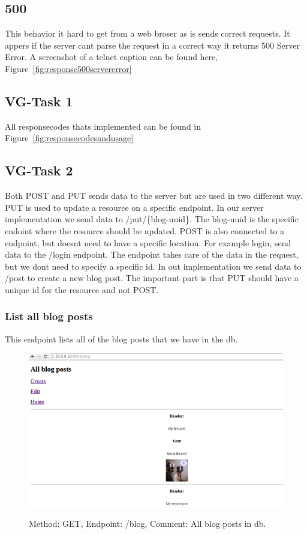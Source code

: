 \documentclass[a4paper,12pt]{article} %
\begin{document}
{\subsection{500}

This behavior it hard to get from a web broser as is sends correct requests.
It appers if the server cant parse the request in a correct way it returns 500 Server Error.
A screenshot of a telnet caption can be found here, Figure~\ref{fig:response500servererror}


\subsection{VG-Task 1}

All responsecodes thats implemented can be found in Figure~\ref{fig:responsecodesandusage}


\subsection{VG-Task 2}

Both POST and PUT sends data to the server but are used in two different way.
PUT is used to update a resource on a specific endpoint.
In our server implementation we send data to /put/\{blog-uuid\}. The blog-uuid is the specific endoint where the resource should be updated.
POST is also connected to a endpoint, but doesnt need to have a specific location.
For example login, send data to the /login endpoint. The endpoint takes care of the data in the request, but we dont need to specify a specific id.
In out implementation we send data to /post to create a new blog  post.
The important part is that PUT should have a unique id for the resource and not POST.\\

\subsubsection{List all blog posts}

This endpoint lists all of the blog posts that we have in the db.

\begin{figure}[H]
    \centering  
    \includegraphics[scale=0.3]{img/screenshots/allblogposts.png}
	\label{fig:allblogposts}
	\caption{Method: GET, Endpoint: /blog, Comment: All blog posts in db.}
\end{figure}


}
\end{document}
